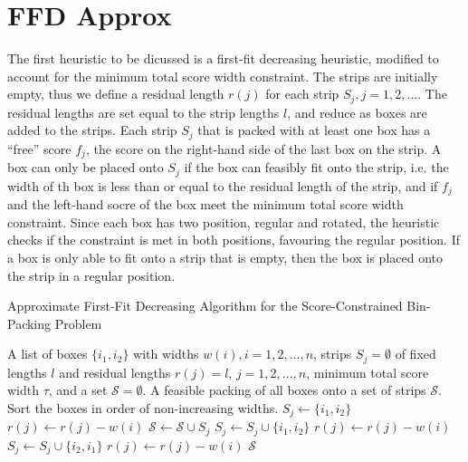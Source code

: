 \documentclass[oribibl]{llncs}
\begin{document}
\section{FFD Approx}
\label{sec:ffdapprox}

The first heuristic to be dicussed is a first-fit decreasing heuristic, modified to account for the minimum total score width constraint. The strips are initially empty, thus we define a residual length $r(j)$ for each strip $S_j, j = 1, 2, ...$. The residual lengths are set equal to the strip lengths $l$, and reduce as boxes are added to the strips. Each strip $S_j$ that is packed with at least one box has a ``free'' score $f_j$, the score on the right-hand side of the last box on the strip. A box can only be placed onto $S_j$ if the box can feasibly fit onto the strip, i.e. the width of th box is less than or equal to the residual length of the strip, and if $f_j$ and the left-hand socre of the box meet the minimum total score width constraint. Since each box has two position, regular and rotated, the heuristic checks if the constraint is met in both positions, favouring the regular position. If a box is only able to fit onto a strip that is empty, then the box is placed onto the strip in a regular position.








\begin{algorithm}[H]
	\caption{\textcolor{OliveGreen}{Approximate First-Fit Decreasing Algorithm for the Score-Constrained Bin-Packing Problem}}
	\label{alg:ffdapprox}
	\begin{algorithmic}[1]
	\Require A list of boxes $\{i_1, i_2\}$ with widths $w(i), i = 1, 2, ..., n$, strips $S_j = \emptyset$ of fixed lengths $l$ and residual lengths $r(j) = l$, $j = 1, 2, ...,n$, minimum total score width $\tau$, and a set $\mathcal{S} = \emptyset$.
	\Ensure A feasible packing of all boxes onto a set of strips $\mathcal{S}$.
	\State Sort the boxes in order of non-increasing widths.
				\State $S_j \gets \{i_1, i_2\}$
				\State $r(j) \gets r(j) - w(i)$
				\State $\mathcal{S} \gets \mathcal{S} \cup S_j$
				\Break
					\State $S_j \gets S_j \cup \{i_1, i_2\}$
					\State $r(j) \gets r(j) - w(i)$
					\Break
					\State $S_j \gets S_j \cup \{i_2, i_1\}$
					\State $r(j) \gets r(j) - w(i)$
					\Break
				\EndIf
			\EndIf
		\EndFor
	\EndFor
	\Return $\mathcal{S}$
	\end{algorithmic}	
\end{algorithm}
\end{document}
